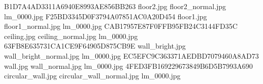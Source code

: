 B1D7A4AD3311A6940E8993AE856BB263 floor2.jpg floor2_normal.jpg lm_0000.jpg
F25BD3345D0F3794A07851AC0A20D454 floor1.jpg floor1_normal.jpg lm_0000.jpg
CAB17957E87F0FFB95FB24C3144FD35C ceiling.jpg ceiling_normal.jpg lm_0000.jpg
63FB8E635731CA1CE9F64905D875CB9E wall_bright.jpg wall_bright_normal.jpg lm_0000.jpg
EC5EFC9C363371AEDBD7079460A8AD73 wall.jpg wall_normal.jpg lm_0000.jpg
4FED3FB169229673849B6D5B7993A690 circular_wall.jpg circular_wall_normal.jpg lm_0000.jpg